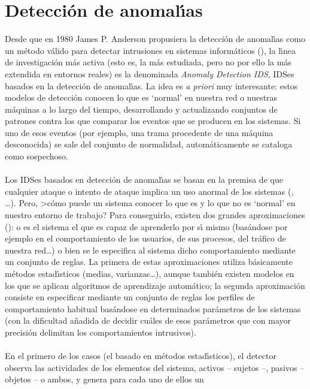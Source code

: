 \section{Detecci\'on de anomal\'{\i}as}
Desde que en 1980 James P. Anderson propusiera la detecci\'on de anomal\'{\i}as
como un m\'etodo v\'alido para detectar intrusiones en sistemas inform\'aticos
(\cite{kn:and80}), la l\'{\i}nea de investigaci\'on m\'as activa (esto es, la 
m\'as estudiada, pero no por ello la m\'as extendida en entornos reales) es 
la de\-no\-mi\-na\-da {\it Anomaly Detection IDS}, IDSes basados en la 
detecci\'on de a\-no\-ma\-l\'{\i}as. La idea es {\it a priori} muy interesante: 
estos
modelos de detecci\'on conocen lo que es `normal' en nuestra red o nuestras
m\'aquinas a lo largo del tiempo, desarrollando y actualizando conjuntos de
patrones contra los que comparar los eventos que se producen en los sistemas. Si
uno de esos eventos (por ejemplo, una trama procedente de una m\'aquina 
desconocida) se sale del conjunto de normalidad, autom\'aticamente se cataloga
como sospechoso.\\
\\Los IDSes basados en detecci\'on de anomal\'{\i}as se basan en la premisa de
que cualquier ataque o intento de ataque implica un uso anormal de los sistemas
(\cite{kn:ko96}, \cite{kn:ks94}\ldots). Pero,
>c\'omo puede un sistema conocer lo que es y lo que no es `normal' en nuestro
entorno de trabajo? Para conseguirlo, existen dos grandes aproximaciones 
(\cite{kn:bus99}): o es el sistema el que es capaz de aprenderlo por s\'{\i}
mismo (bas\'andose por ejemplo en el comportamiento de los usuarios, de sus
procesos, del tr\'afico de nuestra red\ldots) o bien se le especifica al sistema
dicho comportamiento mediante un conjunto de reglas. La primera de estas 
aproximaciones utiliza b\'asicamente
m\'etodos estad\'{\i}sticos (medias, varianzas\ldots), aunque tambi\'en 
existen modelos en los que se aplican algoritmos de aprendizaje autom\'atico; la
segunda aproximaci\'on consiste en especificar mediante un conjunto de reglas
los perfiles de comportamiento habitual bas\'andose en determinados 
par\'ametros de los sistemas (con la dificultad a\~nadida de decidir cu\'ales de
esos par\'ametros que con mayor precisi\'on delimitan los comportamientos
intrusivos).\\
\\En el primero de los casos (el basado en m\'etodos estad\'{\i}sticos), el
detector observa las actividades de los elementos del sistema, activos -- 
sujetos --, pasivos -- objetos -- o ambos, y genera para cada uno de ellos un
